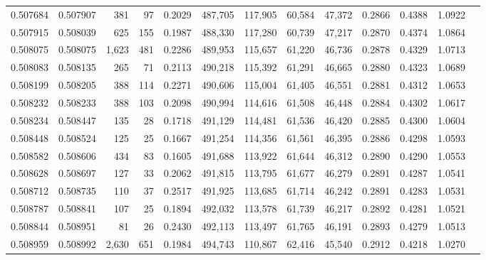 \begin{tabular}{rrrrrrrrrrrrr}
0.507684 & 0.507907 &   381 &    97 &                                     0.2029 & 487,705 & 117,905 &  60,584 &  47,372 & 0.2866 & 0.4388 & 1.0922 \\
0.507915 & 0.508039 &   625 &   155 &                                     0.1987 & 488,330 & 117,280 &  60,739 &  47,217 & 0.2870 & 0.4374 & 1.0864 \\
0.508075 & 0.508075 & 1,623 &   481 &                                     0.2286 & 489,953 & 115,657 &  61,220 &  46,736 & 0.2878 & 0.4329 & 1.0713 \\
0.508083 & 0.508135 &   265 &    71 &                                     0.2113 & 490,218 & 115,392 &  61,291 &  46,665 & 0.2880 & 0.4323 & 1.0689 \\
0.508199 & 0.508205 &   388 &   114 &                                     0.2271 & 490,606 & 115,004 &  61,405 &  46,551 & 0.2881 & 0.4312 & 1.0653 \\
0.508232 & 0.508233 &   388 &   103 &                                     0.2098 & 490,994 & 114,616 &  61,508 &  46,448 & 0.2884 & 0.4302 & 1.0617 \\
0.508234 & 0.508447 &   135 &    28 &                                     0.1718 & 491,129 & 114,481 &  61,536 &  46,420 & 0.2885 & 0.4300 & 1.0604 \\
0.508448 & 0.508524 &   125 &    25 &                                     0.1667 & 491,254 & 114,356 &  61,561 &  46,395 & 0.2886 & 0.4298 & 1.0593 \\
0.508582 & 0.508606 &   434 &    83 &                                     0.1605 & 491,688 & 113,922 &  61,644 &  46,312 & 0.2890 & 0.4290 & 1.0553 \\
0.508628 & 0.508697 &   127 &    33 &                                     0.2062 & 491,815 & 113,795 &  61,677 &  46,279 & 0.2891 & 0.4287 & 1.0541 \\
0.508712 & 0.508735 &   110 &    37 &                                     0.2517 & 491,925 & 113,685 &  61,714 &  46,242 & 0.2891 & 0.4283 & 1.0531 \\
0.508787 & 0.508841 &   107 &    25 &                                     0.1894 & 492,032 & 113,578 &  61,739 &  46,217 & 0.2892 & 0.4281 & 1.0521 \\
0.508844 & 0.508951 &    81 &    26 &                                     0.2430 & 492,113 & 113,497 &  61,765 &  46,191 & 0.2893 & 0.4279 & 1.0513 \\
0.508959 & 0.508992 & 2,630 &   651 &                                     0.1984 & 494,743 & 110,867 &  62,416 &  45,540 & 0.2912 & 0.4218 & 1.0270 \\

\end{tabular}
